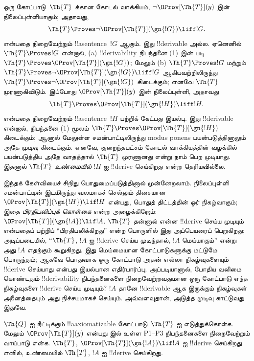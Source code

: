 \documentclass[../../../include/open-logic-section]{subfiles}
\begin{document}



ஒரு கோட்பாடு~$\Th{T}$ க்கான கோடல் வாக்கியம், $\lnot
\OProv[\Th{T}](y)$ இன் நிலைப்புள்ளியாகும்; அதாவது,
\[
\Th{T} \Proves \lnot \OProv[\Th{T}](\gn{!G}) \liff !G.
\]
என்பதை நிறைவேற்றும் !!a{sentence}~$!G$ ஆகும். இது
!!{derivable} அல்ல. ஏனெனில் $\Th{T} \Proves !G$ என்றால்,
(a) !!{derivability} நிபந்தனை (1) இன் படி
$\Th{T} \Proves \OProv[\Th{T}](\gn{!G})$; மேலும் (b)
$\Th{T} \Proves !G$ மற்றும்
$\Th{T} \Proves \lnot \OProv[\Th{T}](\gn{!G}) \liff !G$
ஆகியவற்றிலிருந்து
$\Th{T} \Proves \lnot \OProv[\Th{T}](\gn{!G})$ கிடைக்கும்; எனவே
$\Th{T}$ முரணாகிவிடும். இப்போது
$\OProv[\Th{T}](y)$ இன் நிலைப்புள்ளி, அதாவது
\[
\Th{T} \Proves \OProv[\Th{T}](\gn{!H}) \liff !H.
\]
என்பதை நிறைவேற்றும் !!a{sentence}~$!H$ பற்றிக் கேட்பது இயல்பு.
இது !!{derivable} என்றால், நிபந்தனை (1) மூலம்
$\Th{T} \Proves \OProv[\Th{T}](\gn{!H})$ கிடைக்கும்; ஆனால் மேலுள்ள
சமன்பாட்டிலிருந்து modus ponens பயன்படுத்தினாலும் அதே முடிவு கிடைக்கும்.
எனவே, குறைந்தபட்சம் கோடல் வாக்கியத்தின் வழக்கில் பயன்படுத்திய அதே
வாதத்தால் $\Th{T}$ முரணானது என்று நாம் பெற முடியாது. இதனால்
$\Th{T}$ \emph{உண்மையில்} $!H$ ஐ !!{derive} செய்கிறது என்று தெரியவில்லை.

இந்தக் கேள்வியைச் சிறிது பொதுமைப்படுத்தினால் முன்னேறலாம். நிலைப்புள்ளி
சமன்பாட்டின் இடமிருந்து வலமாகச் செல்லும் திசையான
$\OProv[\Th{T}](\gn{!H}) \lif !H$ என்பது, பொதுத் திட்டத்தின் ஓர்
நிகழ்வாகும்; இதை \emph{பிரதிபலிப்புக் கொள்கை} என்று அழைக்கிறோம்:
$\OProv[\Th{T}](\gn{!A}) \lif !A$. $\Th{T}$ தன்னால் என்ன
!!{derive} செய்ய முடியும் என்பதைப் பற்றிப் “பிரதிபலிக்கிறது” என்ற
பொருளில் இது அப்பெயரைப் பெறுகிறது; அடிப்படையில், “$\Th{T}$,
$!A$ ஐ !!{derive} செய்ய முடிந்தால், $!A$ மெய்யாகும்” என்று அது
$!A$ எதற்கும்
கூறுகிறது. இது மெய்மையான கோட்பாடுகளுக்கு மட்டுமே பொருந்தும்; ஆகவே
பொதுவாக ஒரு கோட்பாடு அதன் எல்லா நிகழ்வுகளையும் !!{derive} செய்யாது
என்பது இயல்பான எதிர்பார்ப்பு. அப்படியானால், போதிய வலிமை கொண்டதும்
!!{derivability} நிபந்தனைகளை நிறைவேற்றுவதுமான ஒரு கோட்பாடு எந்த
நிகழ்வுகளை !!{derive} செய்ய முடியும்? $!A$ தானே !!{derivable} ஆக
இருக்கும் நிகழ்வுகள் அனைத்தையும் அது நிச்சயமாகச் செய்யும். அவ்வளவுதான்,
அடுத்த முடிவு காட்டுவது இதுவே.

\begin{thm}
$\Th{Q}$ ஐ நீட்டிக்கும் !!a{axiomatizable} கோட்பாடு~$\Th{T}$ ஐ
எடுத்துக்கொள்க. மேலும் $\OProv[\Th{T}](y)$ என்பது
 இல் உள்ள P1--P3 நிபந்தனைகளை நிறைவேற்றும் வாய்பாடு
என்க. $\Th{T}$,
$\OProv[\Th{T}](\gn{!A}) \lif !A$ ஐ !!{derive} செய்கிறது எனில்,
உண்மையில் $\Th{T}$, $!A$ ஐ !!{derive} செய்கிறது.
\end{thm}
\end{document}
